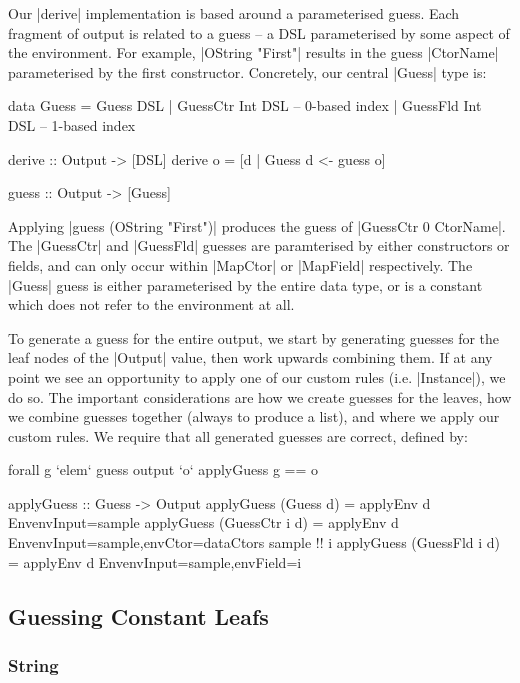 \documentclass[preprint,draft]{sigplanconf}
\begin{document}
Our |derive| implementation is based around a parameterised guess. Each fragment of output is related to a guess -- a DSL parameterised by some aspect of the environment. For example, |OString "First"| results in the guess |CtorName| parameterised by the first constructor. Concretely, our central |Guess| type is:

\begin{code}
data Guess  =  Guess DSL
            |  GuessCtr Int DSL -- 0-based index
            |  GuessFld Int DSL -- 1-based index

derive :: Output -> [DSL]
derive o = [d | Guess d <- guess o]

guess :: Output -> [Guess]
\end{code}

Applying |guess (OString "First")| produces the guess of |GuessCtr 0 CtorName|. The |GuessCtr| and |GuessFld| guesses are paramterised by either constructors or fields, and can only occur within |MapCtor| or |MapField| respectively. The |Guess| guess is either parameterised by the entire data type, or is a constant which does not refer to the environment at all.

To generate a guess for the entire output, we start by generating guesses for the leaf nodes of the |Output| value, then work upwards combining them. If at any point we see an opportunity to apply one of our custom rules (i.e. |Instance|), we do so. The important considerations are how we create guesses for the leaves, how we combine guesses together (always to produce a list), and where we apply our custom rules. We require that all generated guesses are correct, defined by:

\ignore\begin{code}
forall g `elem` guess output `o` applyGuess g == o
\end{code}
\begin{code}
applyGuess :: Guess -> Output
applyGuess (Guess       d) = applyEnv d
    Env{envInput=sample}
applyGuess (GuessCtr i  d) = applyEnv d
    Env{envInput=sample,envCtor=dataCtors sample !! i}
applyGuess (GuessFld i  d) = applyEnv d
    Env{envInput=sample,envField=i}
\end{code}

\subsection{Guessing Constant Leafs}

\subsubsection{String}
\end{document}
